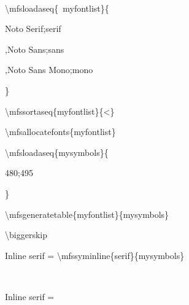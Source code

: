 \documentclass[12pt]{ltxguidex}
\newcommand\cmd[1]{\textbackslash #1}
\newcommand{\varval}[1]{\mbox{\ttfamily\color{blue} #1}}
\begin{document}

\ \begin{minipage}[t]{0.42\linewidth}\ttfamily
\cmd{mfsloadaseq}\{\varval{myfontlist}\}\{\par
Noto Serif;serif\par
,Noto Sans;sans\par
,Noto Sans Mono;mono\par
\}\par
\cmd{mfssortaseq}\{myfontlist\}\{<\}\par
\cmd{mfsallocatefonts}\{myfontlist\}\par
\cmd{mfsloadaseq}\{mysymbols\}\{\par
480;495\par
\}\par
\cmd{mfsgeneratetable}\{myfontlist\}\{mysymbols\}\par

\biggerskip
\cmd{biggerskip}\par
Inline serif = \cmd{mfssyminline}\{serif\}\{mysymbols\}
\end{minipage}
\ \hfill\begin{minipage}[t]{0.42\linewidth}

\biggerskip
Inline serif = 
\end{minipage}
\end{document}
